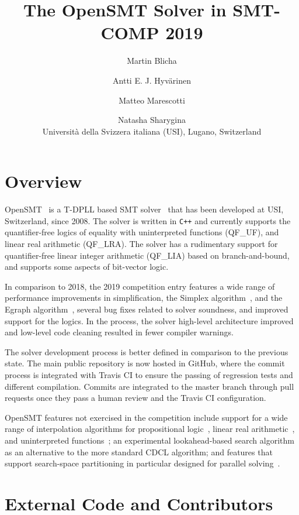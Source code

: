 \documentclass{article}
\title{The OpenSMT Solver in SMT-COMP 2019}
\author{
Martin Blicha \and 
Antti E. J. Hyv{\"a}rinen \and
Matteo Marescotti \and
Natasha Sharygina \\
{\small Universit{\`a} della Svizzera italiana (USI), Lugano,
Switzerland}
}
\date{}
\begin{document}
\maketitle

\section{Overview}

OpenSMT~\cite{HyvarinenMAS16} is a T-DPLL based SMT
solver~\cite{NieuwenhuisOT:JACM06} that has been developed at USI,
Switzerland, since 2008.  The solver is written in {\tt C++} and
currently supports the quantifier-free logics of equality with
uninterpreted functions (QF\_UF), and linear real arithmetic (QF\_LRA).
The solver has a rudimentary support for quantifier-free linear integer
arithmetic (QF\_LIA) based on branch-and-bound, and supports some
aspects of bit-vector logic.

In comparison to 2018, the 2019 competition entry features a wide range
of performance improvements in simplification, the Simplex
algorithm~\cite{DutertreM:CAV06}, and the Egraph
algorithm~\cite{DetlefsNS:JAC05}, several bug fixes related to solver
soundness, and improved support for the logics.  In the process, the
solver high-level architecture improved and low-level code cleaning
resulted in fewer compiler warnings.

The solver development process is better defined in comparison to the
previous state.  The main public repository
 is now
hosted in GitHub, where the commit process is integrated with Travis CI
to ensure the passing of regression tests and different compilation.
Commits are integrated to the master branch through pull requests once
they pass a human review and the Travis CI configuration.

OpenSMT features not exercised in the competition include support for a
wide range of interpolation algorithms for propositional
logic~\cite{AltFHS:VSTTE2015}, linear real
arithmetic~\cite{BlichaHKS19}, and uninterpreted
functions~\cite{AltHAS:FMCAD17}; an experimental look\-ahead-based
search algorithm~\cite{HyvarinenMSCS18} as an alternative to the more
standard CDCL algorithm; and features that support search-space
partitioning in particular designed for parallel
solving~\cite{HyvarinenMS:SAT15}.

\section{External Code and Contributors}
\end{document}
